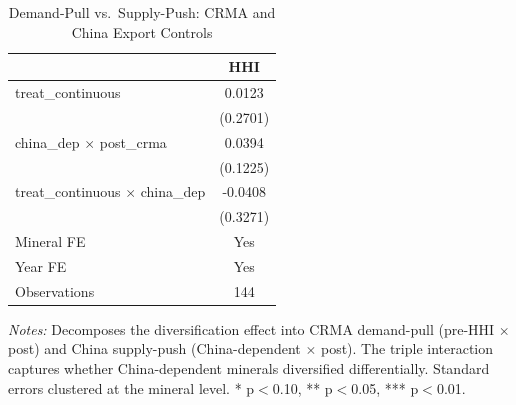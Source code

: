 \begin{table}[H]
\centering
\caption{Demand-Pull vs.~Supply-Push: CRMA and China Export Controls}
\label{tab:china}
\begin{threeparttable}
\begin{tabular}{lc}
\toprule
& HHI \\
\midrule
treat\_continuous & 0.0123 \\
& (0.2701) \\[3pt]
china\_dep $\times$ post\_crma & 0.0394 \\
& (0.1225) \\[3pt]
treat\_continuous $\times$ china\_dep & -0.0408 \\
& (0.3271) \\[3pt]
\midrule
Mineral FE & Yes \\
Year FE & Yes \\
Observations & 144 \\
\bottomrule
\end{tabular}
\begin{tablenotes}[flushleft]
\small
\item \textit{Notes:} Decomposes the diversification effect into CRMA demand-pull (pre-HHI $\times$ post) and China supply-push (China-dependent $\times$ post). The triple interaction captures whether China-dependent minerals diversified differentially. Standard errors clustered at the mineral level. * p$<$0.10, ** p$<$0.05, *** p$<$0.01.
\end{tablenotes}
\end{threeparttable}
\end{table}

